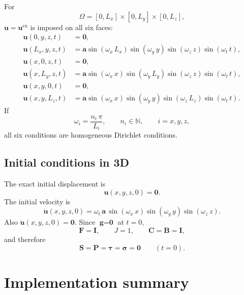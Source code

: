 \documentclass[11pt,a4paper]{article}
\newcommand{\Id}{\textbf{I}}
\begin{document}
For
%
\begin{equation}
\Omega=[0,L_x]\times[0,L_y]\times[0,L_z],
\end{equation}
%
$\textbf{u}=\textbf{u}^{\text{ex}}$ is imposed on all six faces:
%
\begin{align}
\textbf{u}(0,y,z,t)&=\textbf{0},\\
\textbf{u}(L_x,y,z,t)&=\textbf{a}\sin(\omega_x\,L_x)\sin(\omega_y\,y)
\sin(\omega_z\,z)\sin(\omega_t\,t),\\
\textbf{u}(x,0,z,t)&=\textbf{0},\\
\textbf{u}(x,L_y,z,t)&=\textbf{a}\sin(\omega_x\,x)\sin(\omega_y\,L_y)
\sin(\omega_z\,z)\sin(\omega_t\,t),\\
\textbf{u}(x,y,0,t)&=\textbf{0},\\
\textbf{u}(x,y,L_z,t)&=\textbf{a}\sin(\omega_x\,x)\sin(\omega_y\,y)
\sin(\omega_z\,L_z)\sin(\omega_t\,t).
\end{align}
%
If
%
\begin{equation}
\omega_i=\dfrac{n_i\,\pi}{L_i},
\qquad n_i\in\mathbb{N},
\qquad i=x,y,z,
\end{equation}
%
all six conditions are homogeneous Dirichlet conditions.

\subsection{Initial conditions in 3D}

The exact initial displacement is
%
\begin{equation}
\boxed{\textbf{u}(x,y,z,0)=\textbf{0}}.
\label{eq_u0_3D}
\end{equation}
%
The initial velocity is
%
\begin{equation}
\boxed{
\dot{\textbf{u}}(x,y,z,0)
=\omega_t\,\textbf{a}\,
\sin(\omega_x\,x)\sin(\omega_y\,y)\sin(\omega_z\,z)
}.
\label{eq_v0_3D}
\end{equation}
%
Also $\ddot{\textbf{u}}(x,y,z,0)=\textbf{0}$. Since $\textbf{g}=\textbf{0}$ at $t=0$,
%
\begin{equation}
\textbf{F}=\Id,
\qquad
J=1,
\qquad
\textbf{C}=\textbf{B}=\Id,
\end{equation}
%
and therefore
%
\begin{equation}
\boxed{
\textbf{S}=\textbf{P}=\boldsymbol{\tau}=\boldsymbol{\sigma}=\textbf{0}
\qquad (t=0)
}.
\end{equation}

\section{Implementation summary}
\end{document}
